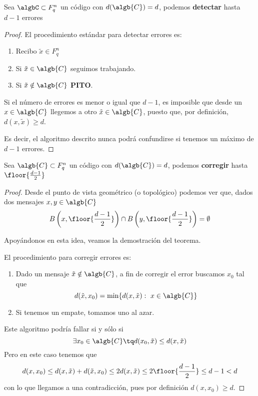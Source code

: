 \begin{theorem}
Sea $\algbC \subset F_q^n$ un código con $d(\algb{C})=d$, podemos \textbf{detectar} hasta $d-1$ errores
\end{theorem}
\begin{proof}
El procedimiento estándar para detectar errores es:
\begin{enumerate}
\item Recibo $\tilde{x} \in F_q^n$

\item Si $\tilde{x}  \in \algb{C}$ seguimos trabajando.

\item Si $\tilde{x} \notin  \algb{C}$ \textbf{PITO}.
\end{enumerate}

Si el número de errores es menor o igual que $d-1$, es imposible que desde un $x\in \algb{C}$ llegemos a otro $\tilde{x} \in \algb{C}$, puesto que, por definición, $d(x,\tilde{x})\geq d$.

Es decir, el algoritmo descrito nunca podrá confundirse si tenemos un máximo de $d-1$ errores.
\end{proof}

\begin{theorem}
Sea $\algb{C} \subset F_q^n$ un código con $d(\algb{C})=d$, podemos \textbf{corregir} hasta $\floor{\frac{d-1}{2}}$
\end{theorem}
\begin{proof}
Desde el punto de vista geométrico (o topológico) podemos ver que, dados dos mensajes $x,y \in \algb{C}$
\[B\left(x,\floor{\frac{d-1}{2}}\right) \cap B\left(y,\floor{\frac{d-1}{2}}\right) = \emptyset\]

Apoyándonos en esta idea, veamos la demostración del teorema.

El procedimiento para corregir errores es:
\begin{enumerate}
\item Dado un mensaje $\tilde{x} \notin \algb{C}$, a fin de corregir el error buscamos $x_0$ tal que
\[d(\tilde{x},x_0)=\min\{d(x,\tilde{x}): \ x\in \algb{C}\}\]

\item Si tenemos un empate, tomamos uno al azar.
\end{enumerate}

Este algoritmo podría fallar si y sólo si
\[\exists x_0 \in \algb{C} \tq d(x_0,\tilde{x}) \leq d(x,\tilde{x})\]
Pero en este caso tenemos que
\[d(x,x_0) \leq d(x,\tilde{x})+d(\tilde{x},x_0) \leq 2d(x,\tilde{x}) \leq 2 \floor{\frac{d-1}{2}} \leq d-1 < d\]
con lo que llegamos a una contradicción, pues por definición $d(x,x_0)\geq d$.
\end{proof}

